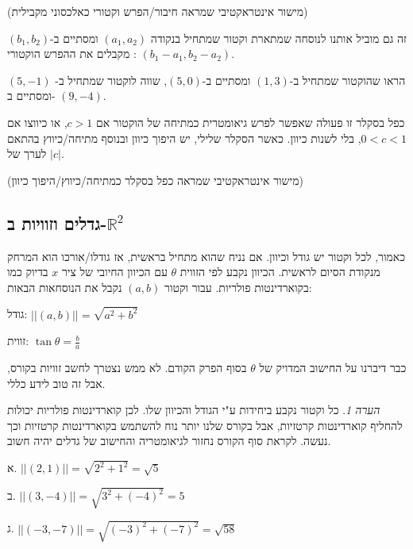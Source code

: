 \documentclass[
  hebrew,
  12pt,
  a4paper,
  oneside]{book}
\theoremstyle{definition}
\theoremstyle{remark}
\theoremstyle{plain}
\theoremstyle{remark}
\newtheorem*{remark}{הערה}
\begin{document}
(מישור אינטראקטיבי שמראה חיבור/הפרש וקטורי כאלכסוני מקבילית)

זה גם מוביל אותנו לנוסחה שמתארת וקטור שמתחיל בנקודה \((a_{1},a_{2})\)
ומסתיים ב-\((b_{1},b_{2})\): מקבלים את ההפרש הוקטורי
\((b_{1}-a_{1},b_{2}-a_{2})\).

\begin{exercise}

הראו שהוקטור שמתחיל ב-\((1,3)\) ומסתיים ב-\((5,0)\), שווה לוקטור שמתחיל
ב- \((5,-1)\) ומסתיים ב- \((9,-4)\).

\end{exercise}

כפל בסקלר זו פעולה שאפשר לפרש גיאומטרית כמתיחה של הוקטור אם \(c>1\), או
כיווצו אם \(0<c<1\), בלי לשנות כיוון. כאשר הסקלר שלילי, יש היפוך כיוון
ובנוסף מתיחה/כיווץ בהתאם לערך של \(|c|\).

(מישור אינטראקטיבי שמראה כפל בסקלר כמתיחה/כיווץ/היפוך כיוון)

\subsection{\texorpdfstring{גדלים וזוויות
ב-\(\mathbb{R}^{2}\)}{גדלים וזוויות ב-\textbackslash mathbb\{R\}\^{}\{2\}}}\label{ux5d2ux5d3ux5dcux5d9ux5dd-ux5d5ux5d6ux5d5ux5d5ux5d9ux5d5ux5ea-ux5d1-mathbbr2}

כאמור, לכל וקטור יש גודל וכיוון. אם נניח שהוא מתחיל בראשית, אז
גודלו/אורכו הוא המרחק מנקודת הסיום לראשית. הכיוון נקבע לפי הזווית
\(\theta\) עם הכיוון החיובי של ציר \(x\) בדיוק כמו בקוארדינטות פולריות.
עבור וקטור \((a,b)\) נקבל את הנוסחאות הבאות:

גודל: \(||(a,b)||=\sqrt{a^{2}+b^{2}}\)

זווית: \(\tan\theta=\frac{b}{a}\)

כבר דיברנו על החישוב המדויק של \(\theta\) בסוף הפרק הקודם. לא ממש נצטרך
לחשב זוויות בקורס, אבל זה טוב לידע כללי.

\begin{remark}
כל וקטור נקבע ביחידות ע"י הגודל והכיוון שלו. לכן קוארדינטות פולריות
יכולות להחליף קוארדינטות קרטזיות, אבל בקורס שלנו יותר נוח להשתמש
בקוארדינטות קרטזיות וכך נעשה. לקראת סוף הקורס נחזור לגיאומטריה והחישוב
של גדלים יהיה חשוב.
\end{remark}

\begin{example}

א. \(||(2,1)||=\sqrt{2^{2}+1^{2}}=\sqrt{5}\)

ב. \(||(3,-4)||=\sqrt{3^{2}+(-4)^{2}}=5\)

ג. \(||(-3,-7)||=\sqrt{(-3)^{2}+(-7)^{2}}=\sqrt{58}\)

\end{example}
\end{document}
